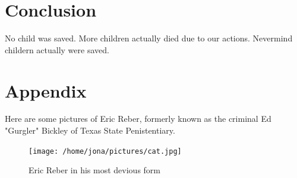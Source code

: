 \documentclass[onecolumn,10pt,cleanfoot]{asme2ej}
\begin{document}
\section{Conclusion}

No child was saved. More children actually died due to our actions. Nevermind childern actually were saved.




\section*{Appendix}

Here are some pictures of Eric Reber, formerly known as the criminal Ed "Gurgler" Bickley of Texas State Penistentiary.


\begin{figure}[h]
\centerline{\texttt{[image: /home/jona/pictures/cat.jpg]}}
\caption{Eric Reber in his most devious form}
\label{real1msetraintest}
\end{figure}
\end{document}
